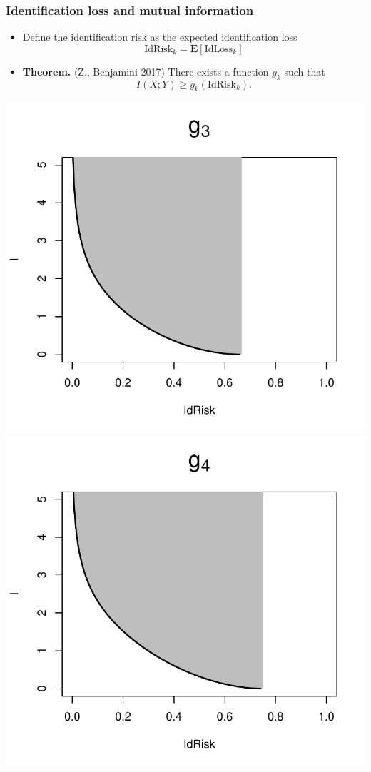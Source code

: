 \documentclass{beamer}
\newcommand{\E}{\textbf{E}}
\begin{document}
\begin{frame}
\frametitle{Identification loss and mutual information}
\begin{itemize}
\item Define the identification risk as the expected identification loss
\[
\text{IdRisk}_k = \E[\text{IdLoss}_k]
\]
\item \textbf{Theorem.} (Z., Benjamini 2017) There exists a function $g_k$ such that
\[I(X; Y) \geq g_k(\text{IdRisk}_k).\]
\end{itemize}
\begin{center}
\includegraphics[scale = 0.4]{../idloss/g3.pdf}
\includegraphics[scale = 0.4]{../idloss/g4.pdf}
\end{center}
\end{frame}
\end{document}
